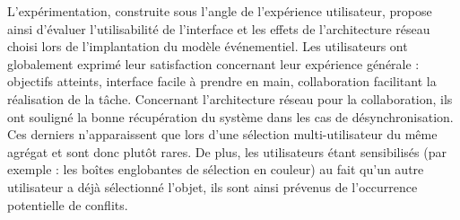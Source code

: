 L'expérimentation, construite sous l'angle de l'expérience utilisateur, propose ainsi 
d'évaluer l'utilisabilité de l'interface et les effets de l'architecture réseau choisi 
lors de l'implantation du modèle événementiel. 
Les utilisateurs ont globalement exprimé leur satisfaction concernant leur 
expérience générale : objectifs atteints, interface facile à prendre en main, 
collaboration facilitant la réalisation de la tâche. 
Concernant l'architecture réseau pour la collaboration, ils ont souligné la bonne 
récupération du système dans les cas de désynchronisation. Ces derniers 
n'apparaissent que lors d'une sélection multi-utilisateur du même agrégat et sont 
donc plutôt rares. De plus, les utilisateurs étant sensibilisés (par exemple : les 
boîtes englobantes de sélection en couleur) au fait qu'un autre utilisateur a déjà 
sélectionné l'objet, ils sont ainsi prévenus de l'occurrence potentielle de conflits. 

